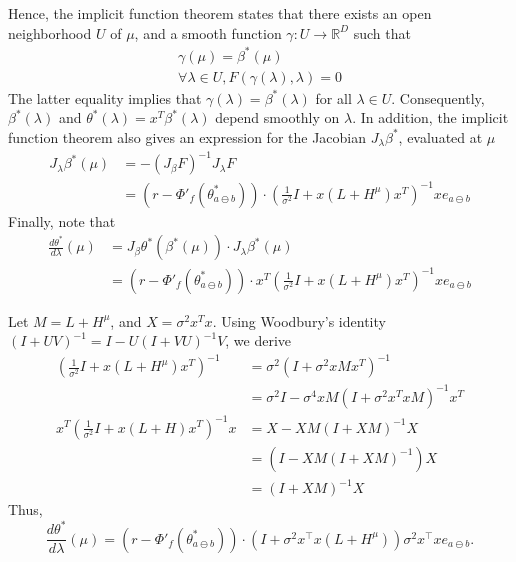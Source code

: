 \documentclass{article}
\newcommand{\ab}{a\ominus{} b}
\begin{document}
    Hence, the implicit function theorem
    states that there exists an open neighborhood $U$
    of $\mu$, and a smooth function $\gamma : U \to \mathbb{R}^D$
    such that
    \begin{gather}
        \gamma(\mu) = \beta^*(\mu) \\
        \forall \lambda \in U, F(\gamma(\lambda), \lambda) = 0
    \end{gather}
    The latter equality implies that $\gamma(\lambda) = \beta^*(\lambda)$
    for all $\lambda \in U$.
    Consequently, $\beta^*(\lambda)$ and $\theta^*(\lambda) = x^T \beta^*(\lambda)$ depend smoothly on $\lambda$.
    In addition, the implicit function theorem also 
    gives an expression for the Jacobian $J_\lambda \beta^*$, evaluated at $\mu$
    \begin{align}
        J_\lambda \beta^*(\mu)
        &=
        - (J_\beta F)^{-1} J_\lambda F \\
        &= (r - \Phi'_f(\theta^*_{\ab})) \cdot
        \left(\frac{1}{\sigma^2}I + x(L + H^\mu)x^T\right)^{-1}  x e_{\ab}
    \end{align}
    Finally, note that
    \begin{align}
        \frac{d \theta^*}{d\lambda}(\mu)
        &= J_\beta \theta^*(\beta^*(\mu)) \cdot J_\lambda \beta^*(\mu) \\
        &= (r - \Phi'_f(\theta^*_{\ab}))
        \cdot  x^T \left(\frac{1}{\sigma^2}I + x (L + H^\mu) x^T\right)^{-1} x e_{\ab}
    \end{align}

    Let $M = L + H^\mu$, and $X = \sigma^2 x^Tx$.
    Using Woodbury's identity $(I + UV)^{-1} = I - U(I + VU)^{-1}V$,
    we derive
    \begin{align}
        \left(\frac{1}{\sigma^2}I + x(L + H^\mu)x^T\right)^{-1}
        &= \sigma^2 (I + \sigma^2 xMx^T)^{-1}  \\
        &= \sigma^2I - \sigma^4 xM(I + \sigma^2 x^T x M)^{-1} x^T \\
        x^T\left(\frac{1}{\sigma^2}I + x(L + H)x^T\right)^{-1}x
        &= X - XM(I + XM)^{-1}X   \\
        &= (I - XM(I + XM)^{-1})X \\
        &= (I + XM)^{-1} X 
        \label{eq:woodbury-chaining}
    \end{align}
    Thus,
    \begin{equation}
        \frac{d \theta^*}{d\lambda}(\mu)
        = (r - \Phi'_f(\theta^*_{\ab}))
        \cdot (I + \sigma^2 x^\top x (L + H^\mu)) \sigma^2 x^\top x
        e_{\ab}.
    \end{equation}
\end{document}
